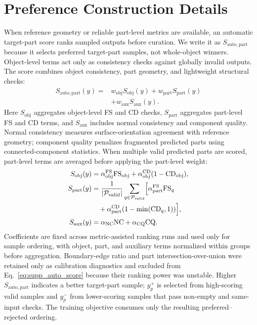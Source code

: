 \documentclass[10pt,twocolumn,letterpaper]{article}
\begin{document}
\section{Preference Construction Details}
When reference geometry or reliable part-level metrics are available, an automatic target-part score ranks sampled outputs before curation. We write it as $S_{\mathrm{auto},\mathrm{part}}$ because it selects preferred target-part samples, not whole-object winners. Object-level terms act only as consistency checks against globally invalid outputs. The score combines object consistency, part geometry, and lightweight structural checks:
{\small
\begin{equation}
\begin{aligned}
S_{\mathrm{auto},\mathrm{part}}(y) =
&w_{\mathrm{obj}}S_{\mathrm{obj}}(y)
+w_{\mathrm{part}}S_{\mathrm{part}}(y)\\
&+w_{\mathrm{aux}}S_{\mathrm{aux}}(y).
\end{aligned}
\label{eq:supp_auto_score}
\end{equation}
}
Here $S_{\mathrm{obj}}$ aggregates object-level FS and CD checks, $S_{\mathrm{part}}$ aggregates part-level FS and CD terms, and $S_{\mathrm{aux}}$ includes normal consistency and component quality. Normal consistency measures surface-orientation agreement with reference geometry; component quality penalizes fragmented predicted parts using connected-component statistics. When multiple valid predicted parts are scored, part-level terms are averaged before applying the part-level weight:
{\small
\begin{equation}
\begin{aligned}
S_{\mathrm{obj}}(y)&=
\alpha_{\mathrm{obj}}^{\mathrm{FS}}\mathrm{FS}_{\mathrm{obj}}
+\alpha_{\mathrm{obj}}^{\mathrm{CD}}(1-\mathrm{CD}_{\mathrm{obj}}),\\
S_{\mathrm{part}}(y)&=
\frac{1}{|\mathcal{P}_{\mathrm{valid}}|}
\sum_{q\in\mathcal{P}_{\mathrm{valid}}}
\Bigl[
\alpha_{\mathrm{part}}^{\mathrm{FS}}\mathrm{FS}_{q}\\
&\quad+\alpha_{\mathrm{part}}^{\mathrm{CD}}
(1-\min(\mathrm{CD}_{q},1))
\Bigr],\\
S_{\mathrm{aux}}(y)&=
\alpha_{\mathrm{NC}}\mathrm{NC}
+\alpha_{\mathrm{CQ}}\mathrm{CQ}.
\end{aligned}
\end{equation}
}
Coefficients are fixed across metric-assisted ranking runs and used only for sample ordering, with object, part, and auxiliary terms normalized within groups before aggregation. Boundary-edge ratio and part intersection-over-union were retained only as calibration diagnostics and excluded from Eq.~\ref{eq:supp_auto_score} because their ranking power was unstable. Higher $S_{\mathrm{auto},\mathrm{part}}$ indicates a better target-part sample; $y_p^+$ is selected from high-scoring valid samples and $y_p^-$ from lower-scoring samples that pass non-empty and same-input checks. The training objective consumes only the resulting preferred--rejected ordering.
\end{document}
